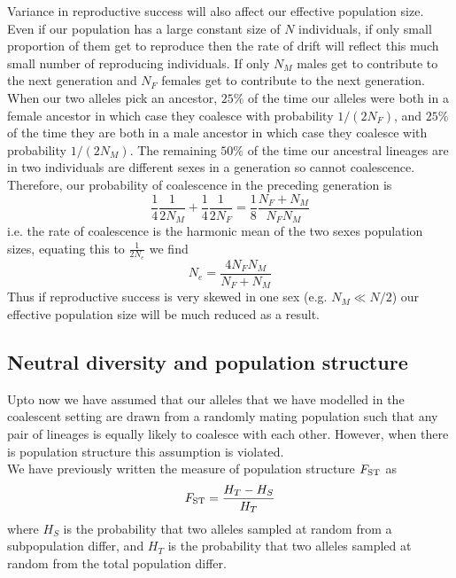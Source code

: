 Variance in reproductive success will also affect our effective
population size. Even if our population has a large constant size of $N$
individuals, if only small proportion of them get to reproduce then
the rate of drift will reflect this much small number of reproducing
individuals. If only $N_M$ males get to contribute to the next
generation and $N_F$ females get to contribute to the next
generation. When our two alleles pick an ancestor, $25\%$ of the time
our alleles were both in a female ancestor in which case they coalesce
with probability $1/(2N_F)$, and $25\%$ of the time they are both in a
male ancestor in which case they coalesce with probability
$1/(2N_M)$. The remaining $50\%$ of the time our ancestral lineages
are in two individuals are different sexes in a generation so cannot
coalescence.  Therefore, our probability of coalescence in the preceding
generation is
\begin{equation}
\frac{1}{4}\frac{1}{2N_M}+\frac{1}{4}\frac{1}{2N_F} =
\frac{1}{8}\frac{N_F+N_M}{N_FN_M} 
\end{equation}
i.e. the rate of coalescence is the harmonic mean of the two
sexes population sizes, 
equating this to $\frac{1}{2N_e}$ we find
\begin{equation}
N_e = \frac{4N_FN_M}{N_F+N_M}
\end{equation}
Thus if reproductive success is very skewed in one sex (e.g. $N_M \ll
N/2$) our effective population size will be much reduced as a result.\\


\subsection{Neutral diversity and population structure}
Upto now we have assumed that our alleles that we have modelled in the
coalescent setting are drawn from a randomly mating population such
that any pair of lineages is equally likely to coalesce with each
other. However, when there is population structure this assumption is
violated. \\

We have previously written the measure of population structure
$F_{\mathrm{ST}}$ as
\begin{equation}
F_{\mathrm{ST}} = \frac{H_T-H_S}{H_T}
\end{equation}
where $H_S$ is the probability that two alleles sampled at random from a
subpopulation differ, and $H_T$ is the probability that two alleles
sampled at random from the total population differ. 

